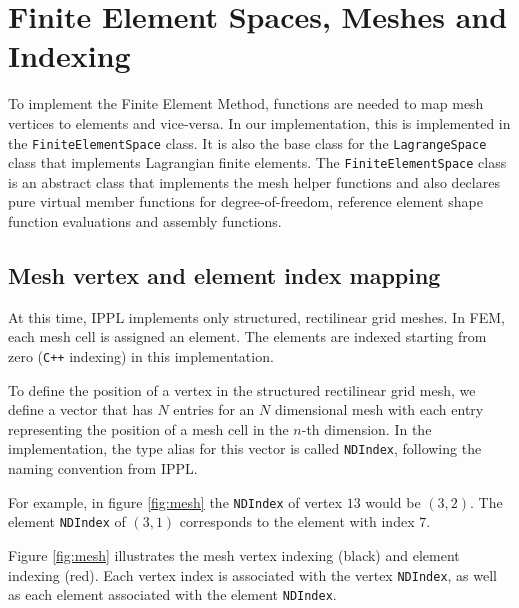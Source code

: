 \section{Finite Element Spaces, Meshes and Indexing}

To implement the Finite Element Method, functions are needed to map mesh vertices to elements and vice-versa.
In our implementation, this is implemented in the \texttt{FiniteElementSpace} class. It is also the base
class for the \texttt{LagrangeSpace} class that implements Lagrangian finite elements.
The \texttt{FiniteElementSpace} class is an abstract class that implements the mesh helper functions and also declares pure virtual member
functions for degree-of-freedom, reference element shape function evaluations and assembly functions.

\subsection{Mesh vertex and element index mapping}

At this time, IPPL implements only structured, rectilinear grid meshes.
In FEM, each mesh cell is assigned an element. The elements are indexed starting from zero (\texttt{C++} indexing)
in this implementation.

To define the position of a vertex in the structured rectilinear grid mesh,
we define a vector that has $N$ entries for an $N$ dimensional mesh with each entry representing
the position of a mesh cell in the $n$-th dimension.
In the implementation, the type alias for this vector is called \texttt{NDIndex},
following the naming convention from IPPL.

For example, in figure \ref{fig:mesh} the \texttt{NDIndex} of vertex $13$ would be $(3, 2)$.
The element \texttt{NDIndex} of $(3,1)$ corresponds to the element with index $7$.

Figure \ref{fig:mesh} illustrates the mesh vertex indexing (black) and element indexing (red).
Each vertex index is associated with the vertex \texttt{NDIndex},
as well as each element associated with the element \texttt{NDIndex}.

